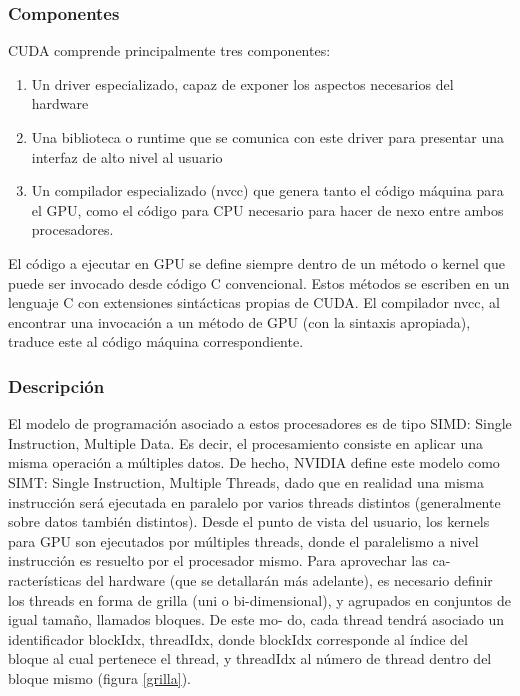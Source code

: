 \documentclass[a4paper,10pt]{report}
\begin{document}
\subsubsection{Componentes}
CUDA comprende principalmente tres componentes:
\begin{enumerate}
\item Un driver especializado, capaz de exponer los aspectos necesarios del hardware
\item Una biblioteca o runtime que se comunica con este driver para presentar una interfaz de alto nivel al usuario
\item Un compilador especializado (nvcc) que genera tanto el código máquina para el GPU, como el código para CPU necesario para hacer de nexo entre ambos procesadores.
\end{enumerate}

El código a ejecutar en GPU se define siempre dentro de un método o kernel que puede ser invocado
desde código C convencional. Estos métodos se escriben en un lenguaje C con extensiones sintácticas
propias de CUDA. El compilador nvcc, al encontrar una invocación a un método de GPU (con la sintaxis
apropiada), traduce este al código máquina correspondiente.

\subsubsection{Descripción}
El modelo de programación asociado a estos procesadores es de tipo SIMD: Single Instruction,
Multiple Data. Es decir, el procesamiento consiste en aplicar una misma operación a múltiples datos.
De hecho, NVIDIA define este modelo como SIMT: Single Instruction, Multiple Threads, dado que en
realidad una misma instrucción será ejecutada en paralelo por varios threads distintos (generalmente
sobre datos también distintos).
Desde el punto de vista del usuario, los kernels para GPU son ejecutados por múltiples threads,
donde el paralelismo a nivel instrucción es resuelto por el procesador mismo. Para aprovechar las ca-
racterísticas del hardware (que se detallarán más adelante), es necesario definir los threads en forma de
grilla (uni o bi-dimensional), y agrupados en conjuntos de igual tamaño, llamados bloques. De este mo-
do, cada thread tendrá asociado un identificador blockIdx, threadIdx, donde blockIdx corresponde al 
índice del bloque al cual pertenece el thread, y threadIdx al número de thread dentro del bloque mismo (figura \ref{grilla}).
\end{document}
